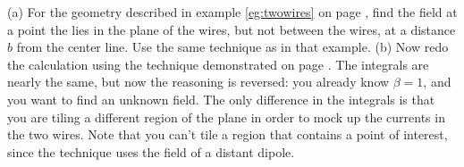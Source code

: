         (a) For the geometry described in example \ref{eg:twowires} on page \pageref{eg:twowires},
        find the field at a point the lies in the plane of the wires, but not between the wires,
        at a distance $b$ from the center line. 
        Use the same technique as in that example.\hwendpart
        (b) Now redo the calculation using the technique demonstrated on
        page \pageref{dipolestomakewire}. The integrals are nearly the same, but now the
        reasoning is reversed: you already know $\beta=1$, and you want to find an unknown
        field. The only difference in the integrals is that you are tiling a different
        region of the plane in order to mock up the currents in the two wires. Note that
        you can't tile a region that contains a point of interest, since the technique
        uses the field of a distant dipole.\answercheck

